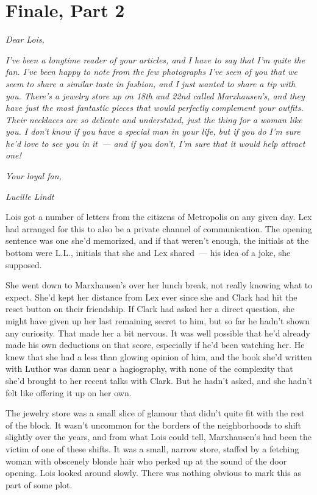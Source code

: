 \chapter{Finale, Part 2}\label{finale-part-2}

\emph{Dear Lois,}

\emph{I've been a longtime reader of your articles, and I have to say
that I'm quite the fan. I've been happy to note from the few photographs
I've seen of you that we seem to share a similar taste in fashion, and I
just wanted to share a tip with you. There's a jewelry store up on 18th
and 22nd called Marxhausen's, and they have just the most fantastic
pieces that would perfectly complement your outfits. Their necklaces are
so delicate and understated, just the thing for a woman like you. I
don't know if you have a special man in your life, but if you do I'm
sure he'd love to see you in it~--- and if you don't, I'm sure that it
would help attract one!}

\emph{Your loyal fan,}

\emph{Lucille Lindt}

Lois got a number of letters from the citizens of Metropolis on any
given day. Lex had arranged for this to also be a private channel of
communication. The opening sentence was one she'd memorized, and if that
weren't enough, the initials at the bottom were L.L., initials that she
and Lex shared~--- his idea of a joke, she supposed.

She went down to Marxhausen's over her lunch break, not really knowing
what to expect. She'd kept her distance from Lex ever since she and
Clark had hit the reset button on their friendship. If Clark had asked
her a direct question, she might have given up her last remaining secret
to him, but so far he hadn't shown any curiosity. That made her a bit
nervous. It was well possible that he'd already made his own deductions
on that score, especially if he'd been watching her. He knew that she
had a less than glowing opinion of him, and the book she'd written with
Luthor was damn near a hagiography, with none of the complexity that
she'd brought to her recent talks with Clark. But he hadn't asked, and
she hadn't felt like offering it up on her own.

The jewelry store was a small slice of glamour that didn't quite fit
with the rest of the block. It wasn't uncommon for the borders of the
neighborhoods to shift slightly over the years, and from what Lois could
tell, Marxhausen's had been the victim of one of these shifts. It was a
small, narrow store, staffed by a fetching woman with obscenely blonde
hair who perked up at the sound of the door opening. Lois looked around
slowly. There was nothing obvious to mark this as part of some plot.

